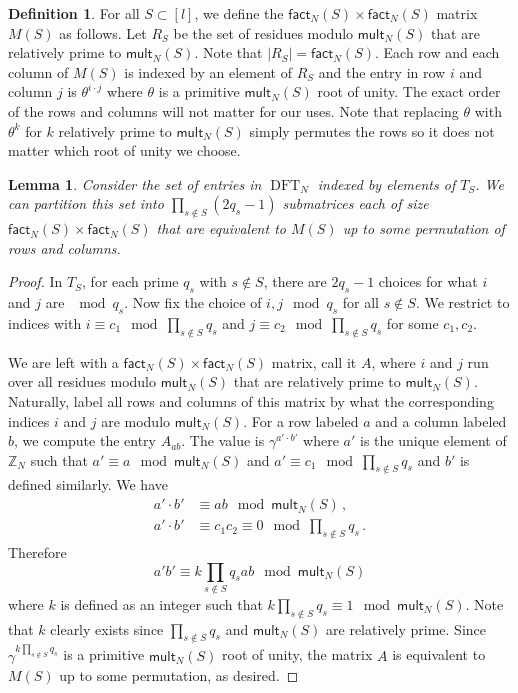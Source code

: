 \documentclass[11pt]{article}
\numberwithin{equation}{section}
\newtheorem{lemma}[theorem]{Lemma}
\theoremstyle{definition}
\theoremstyle{plain}
\newcommand{\Z}{\mathbb Z}
\theoremstyle{definition}
\newtheorem{define}[theorem]{Definition}
\renewcommand\Z{{\mathbb{Z}}}
\renewcommand\fact{\textsf{fact}}
\newcommand\mult{\textsf{mult}}
\DeclareMathOperator{\DFT}{DFT}
\begin{document}
\begin{define}\label{def_factormatrix}
For all $S \subset [l]$, we define the $\fact_N(S) \times \fact_N(S)$ matrix $M(S)$ as follows.  Let $R_S$ be the set of residues modulo $ \mult_N(S)$ that are relatively prime to $\mult_N(S)$.  Note that $|R_S| = \fact_N(S)$.  Each row and each column of $M(S)$ is indexed by an element of $R_S$ and the entry in row $i$ and column $j$ is $\theta^{i \cdot j}$ where $\theta$ is a primitive $\mult_N(S)$ root of unity.  The exact order of the rows and columns will not matter for our uses.  Note that replacing $\theta$ with $\theta^k$ for $k$ relatively prime to $\mult_N(S)$ simply permutes the rows so it does not matter which root of unity we choose.
\end{define}


\begin{lemma}\label{division}
Consider the set of entries in %
$\DFT_N$ %
 indexed by elements of $T_S$.  We can partition this set into $\prod_{s \notin S}(2q_s-1)$ submatrices each of size $\fact_N(S) \times \fact_N(S)$ that are equivalent to $M(S)$ up to some permutation of rows and columns.
\end{lemma}
\begin{proof}
In $T_S$, for each prime $q_s$ with $s \notin S$, there are $2q_s - 1$ choices for what $i$ and $j$ are $\mod q_s$.  Now fix the choice of $i,j \mod q_s$ for all $s \notin S$.  
%
We %
restrict to indices with $i \equiv c_1 \mod \prod_{s \notin S}q_s$ and $j \equiv c_2 \mod \prod_{s \notin S}q_s$
%
for some $c_1,c_2$. %
  


We are left with a $\fact_N(S) \times \fact_N(S)$ matrix, call it $A$, where $i$ and $j$ run over all residues modulo $\mult_N(S)$ that are relatively prime to $\mult_N(S)$.  Naturally, label all rows and columns of this matrix by what the corresponding indices $i$ and $j$ are modulo $ \mult_N(S)$.  For a row labeled $a$ and a column labeled $b$, we compute the entry $A_{ab}$.  The value is $\gamma^{a' \cdot b'}$ where $a'$ is the unique element of $\Z_N$ such that $a' \equiv a \mod \mult_N(S)$ and $a' \equiv c_1 \mod  \prod_{s \notin S}q_s$ and $b'$ is defined similarly.  We have
\begin{align*}
  a' \cdot b' &\equiv ab \mod \mult_N(S)\,,\\[1ex]
  a' \cdot b' &\equiv c_1c_2 \equiv 0 \mod \prod_{s \notin S}q_s \,.
\end{align*}
Therefore
\[
a'b' \equiv k\prod_{s \notin S}q_s ab \mod \mult_N(S)
\]
where $k$ is defined as an integer such that $k\prod_{s \notin S}q_s \equiv 1 \mod \mult_N(S)$.  Note that $k$ clearly exists since $\prod_{s \notin S}q_s$ and $\mult_N(S)$ are relatively prime.  Since $\gamma^{k\prod_{s \notin S}q_s}$ is a primitive $\mult_N(S)$ root of unity, the matrix $A$ is equivalent to $M(S)$ up to some permutation, as desired.
\end{proof} 
\end{document}
